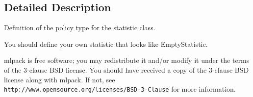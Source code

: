 \subsection{Detailed Description}
Definition of the policy type for the statistic class. 

You should define your own statistic that looks like Empty\+Statistic.

mlpack is free software; you may redistribute it and/or modify it under the terms of the 3-\/clause B\+SD license. You should have received a copy of the 3-\/clause B\+SD license along with mlpack. If not, see {\tt http\+://www.\+opensource.\+org/licenses/\+B\+S\+D-\/3-\/\+Clause} for more information. 